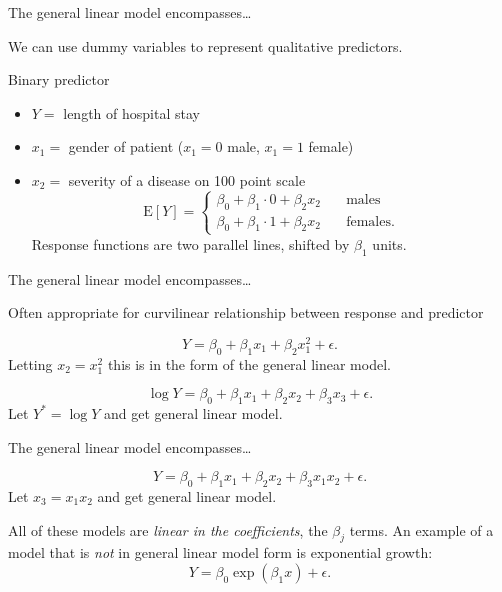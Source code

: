 \documentclass{beamer}
\newcommand{\E}{\mathrm{E}}
\begin{document}
\begin{frame}{The general linear model encompasses\ldots}


We can use dummy variables to represent qualitative predictors.

\pause \begin{example}
Binary predictor
\begin{itemize}
\item\pause $Y = $ length of hospital stay
\item\pause $x_1= $ gender of patient ($x_1=0$ male, $x_1=1$ female)
\item\pause $x_2= $ severity of a disease on 100 point scale
\pause $$
\E[Y]=\begin{cases}
\beta_0+\beta_1\cdot0+\beta_2 x_2\quad &\text{males}\\
\beta_0+\beta_1\cdot1 + \beta_2 x_2\quad &\text{females}.
\end{cases}
$$
\pause Response functions are two parallel lines, shifted by $\beta_1$ units.
\end{itemize}
\end{example}
\end{frame}


\begin{frame}{The general linear model encompasses\ldots}


\pause Often appropriate for curvilinear relationship between response and predictor

\pause \begin{example}
$$
Y=\beta_0+\beta_1 x_1 + \beta_2 x_1^2 + \epsilon.
$$
\pause Letting $x_2=x_1^2$ this is in the form of the general linear model.
\end{example}
\vspace{20pt}

\pause {}

\pause \begin{example}
$$
\log Y=\beta_0+\beta_1 x_1 + \beta_2 x_2 + \beta_3 x_3 + \epsilon.
$$
\pause Let $Y^\ast=\log Y$ and get general linear model.
\end{example}
\end{frame}

\begin{frame}{The general linear model encompasses\ldots}
\pause \begin{example}
$$
Y=\beta_0+\beta_1 x_1 + \beta_2 x_2 + \beta_3 x_1 x_2 + \epsilon.
$$
\pause Let $x_3=x_1 x_2$ and get general linear model.
\end{example}
\hrulefill

\pause All of these models are \textit{linear in the coefficients}, the $\beta_j$ terms. \pause An example of a model that is \textit{not} in general linear model form is exponential growth:
$$
Y=\beta_0\exp(\beta_1 x)+\epsilon.
$$

\end{frame}
\end{document}
